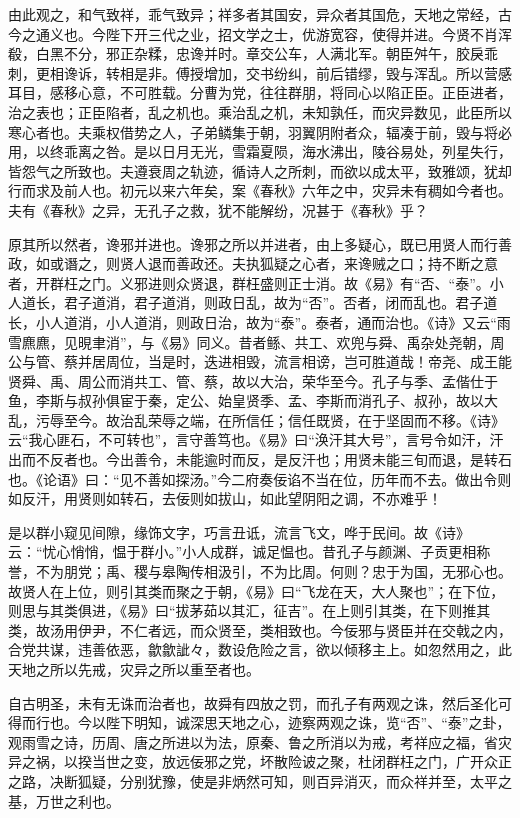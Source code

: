 \documentclass[12pt,UTF8]{ctexbook}
\begin{document}
由此观之，和气致祥，乖气致异；祥多者其国安，异众者其国危，天地之常经，古今之通义也。今陛下开三代之业，招文学之士，优游宽容，使得并进。今贤不肖浑殽，白黑不分，邪正杂糅，忠谗并时。章交公车，人满北军。朝臣舛午，胶戾乖刺，更相谗诉，转相是非。傅授增加，交书纷纠，前后错缪，毁与浑乱。所以营感耳目，感移心意，不可胜载。分曹为党，往往群朋，将同心以陷正臣。正臣进者，治之表也；正臣陷者，乱之机也。乘治乱之机，未知孰任，而灾异数见，此臣所以寒心者也。夫乘权借势之人，子弟鳞集于朝，羽翼阴附者众，辐凑于前，毁与将必用，以终乖离之咎。是以日月无光，雪霜夏陨，海水沸出，陵谷易处，列星失行，皆怨气之所致也。夫遵衰周之轨迹，循诗人之所刺，而欲以成太平，致雅颂，犹却行而求及前人也。初元以来六年矣，案《春秋》六年之中，灾异未有稠如今者也。夫有《春秋》之异，无孔子之救，犹不能解纷，况甚于《春秋》乎？



原其所以然者，谗邪并进也。谗邪之所以并进者，由上多疑心，既已用贤人而行善政，如或谮之，则贤人退而善政还。夫执狐疑之心者，来谗贼之口；持不断之意者，开群枉之门。义邪进则众贤退，群枉盛则正士消。故《易》有“否、“泰”。小人道长，君子道消，君子道消，则政日乱，故为“否”。否者，闭而乱也。君子道长，小人道消，小人道消，则政日治，故为“泰”。泰者，通而治也。《诗》又云“雨雪麃麃，见晛聿消”，与《易》同义。昔者鲧、共工、欢兜与舜、禹杂处尧朝，周公与管、蔡并居周位，当是时，迭进相毁，流言相谤，岂可胜道哉！帝尧、成王能贤舜、禹、周公而消共工、管、蔡，故以大治，荣华至今。孔子与季、孟偕仕于鱼，李斯与叔孙俱宦于秦，定公、始皇贤季、孟、李斯而消孔子、叔孙，故以大乱，污辱至今。故治乱荣辱之端，在所信任；信任既贤，在于坚固而不移。《诗》云“我心匪石，不可转也”，言守善笃也。《易》曰“涣汗其大号”，言号令如汗，汗出而不反者也。今出善令，未能逾时而反，是反汗也；用贤未能三旬而退，是转石也。《论语》曰：“见不善如探汤。”今二府奏佞谄不当在位，历年而不去。做出令则如反汗，用贤则如转石，去佞则如拔山，如此望阴阳之调，不亦难乎！



是以群小窥见间隙，缘饰文字，巧言丑诋，流言飞文，哗于民间。故《诗》云：“忧心悄悄，愠于群小。”小人成群，诚足愠也。昔孔子与颜渊、子贡更相称誉，不为朋党；禹、稷与皋陶传相汲引，不为比周。何则？忠于为国，无邪心也。故贤人在上位，则引其类而聚之于朝，《易》曰“飞龙在天，大人聚也”；在下位，则思与其类俱进，《易》曰“拔茅茹以其汇，征吉”。在上则引其类，在下则推其类，故汤用伊尹，不仁者远，而众贤至，类相致也。今佞邪与贤臣并在交戟之内，合党共谋，违善依恶，歙歙訿々，数设危险之言，欲以倾移主上。如忽然用之，此天地之所以先戒，灾异之所以重至者也。



自古明圣，未有无诛而治者也，故舜有四放之罚，而孔子有两观之诛，然后圣化可得而行也。今以陛下明知，诚深思天地之心，迹察两观之诛，览“否”、“泰”之卦，观雨雪之诗，历周、唐之所进以为法，原秦、鲁之所消以为戒，考祥应之福，省灾异之祸，以揆当世之变，放远佞邪之党，坏散险诐之聚，杜闭群枉之门，广开众正之路，决断狐疑，分别犹豫，使是非炳然可知，则百异消灭，而众祥并至，太平之基，万世之利也。
\end{document}
